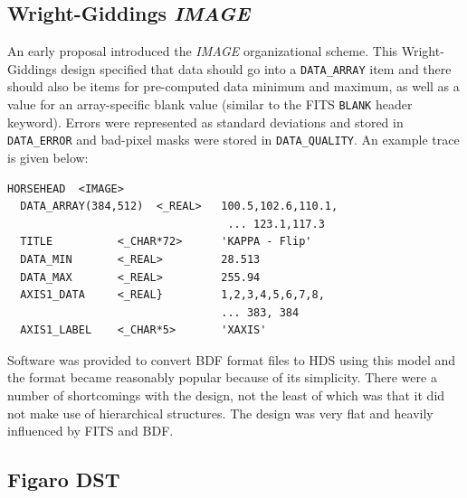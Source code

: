 \documentclass[final,authoryear,5p,times,twocolumn]{elsarticle}
\begin{document}
\subsection{Wright-Giddings \emph{IMAGE}}

An early proposal \citep[][but see also \citet{SGP38}]{WrightGiddings1983} introduced the
\emph{IMAGE} organizational scheme. This Wright-Giddings design specified that
data should go into a \texttt{DATA\_ARRAY} item and there should also be
items for pre-computed data minimum and maximum, as well as a value for
an array-specific blank value (similar to the FITS \texttt{BLANK}
header keyword). Errors were represented as standard
deviations and stored in \texttt{DATA\_ERROR} and bad-pixel masks were
stored in \texttt{DATA\_QUALITY}. An example trace is given below:

{
\small
\begin{verbatim}
HORSEHEAD  <IMAGE>
  DATA_ARRAY(384,512)  <_REAL>   100.5,102.6,110.1,
                                  ... 123.1,117.3
  TITLE          <_CHAR*72>      'KAPPA - Flip'
  DATA_MIN       <_REAL>         28.513
  DATA_MAX       <_REAL>         255.94
  AXIS1_DATA     <_REAL}         1,2,3,4,5,6,7,8,
                                 ... 383, 384
  AXIS1_LABEL    <_CHAR*5>       'XAXIS'
\end{verbatim}
}

Software was provided to convert BDF format files to HDS using this
model \citep{SUN96} and the format became reasonably popular because
of its simplicity. There were a number of shortcomings with the
design, not the least of which was that it did not make use of
hierarchical structures. The design was very flat and heavily
influenced by FITS and BDF.

\subsection{Figaro DST}
\end{document}
